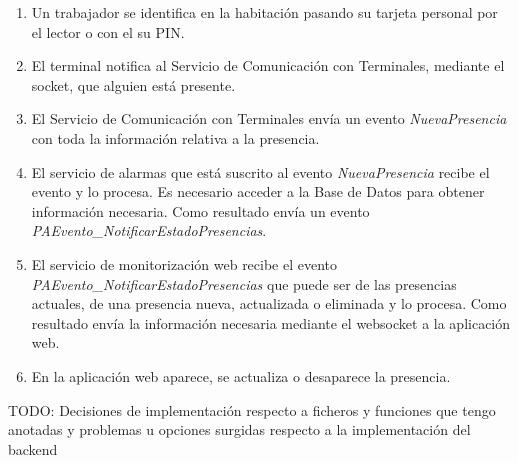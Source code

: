 \begin{enumerate}
	\item Un trabajador se identifica en la habitación pasando su tarjeta personal por el lector o con el su PIN.
	\item El terminal notifica al Servicio de Comunicación con Terminales, mediante el socket, que alguien está presente.
	\item El Servicio de Comunicación con Terminales envía un evento \textit{NuevaPresencia} con toda la información relativa a la presencia.
	\item El servicio de alarmas que está suscrito al evento \textit{NuevaPresencia} recibe el evento y lo procesa. Es necesario acceder a la Base de Datos para obtener información necesaria. Como resultado envía un evento \textit{PAEvento\_NotificarEstadoPresencias}.
	\item El servicio de monitorización web recibe el evento \textit{PAEvento\_NotificarEstadoPresencias} que puede ser de las presencias actuales, de una presencia nueva, actualizada o eliminada y lo procesa. Como resultado envía la información necesaria mediante el websocket a la aplicación web.
	\item En la aplicación web aparece, se actualiza o desaparece la presencia.
\end{enumerate}


TODO: Decisiones de implementación respecto a ficheros y funciones que tengo anotadas y problemas u opciones surgidas respecto a la implementación del backend\\
